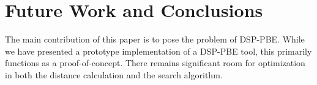 \section{Future Work and Conclusions}

The main contribution of this paper is to pose the problem of DSP-PBE.
While we have presented a prototype implementation of a DSP-PBE tool, this primarily functions as a proof-of-concept.
There remains significant room for optimization in both the distance calculation and the search algorithm.
